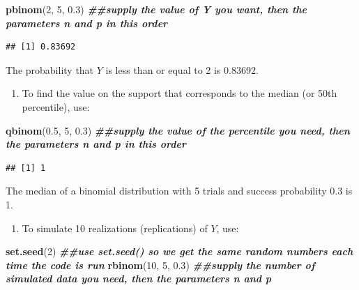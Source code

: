 \documentclass[
]{book}
\newenvironment{Shaded}{\begin{snugshade}}{\end{snugshade}}
\newcommand{\DecValTok}[1]{\textcolor[rgb]{0.00,0.00,0.81}{#1}}
\newcommand{\DocumentationTok}[1]{\textcolor[rgb]{0.56,0.35,0.01}{\textbf{\textit{#1}}}}
\newcommand{\FloatTok}[1]{\textcolor[rgb]{0.00,0.00,0.81}{#1}}
\newcommand{\FunctionTok}[1]{\textcolor[rgb]{0.13,0.29,0.53}{\textbf{#1}}}
\newcommand{\NormalTok}[1]{#1}
\providecommand{\tightlist}{%
  \setlength{\itemsep}{0pt}\setlength{\parskip}{0pt}}
\begin{document}
\begin{Shaded}
\begin{Highlighting}[]
\FunctionTok{pbinom}\NormalTok{(}\DecValTok{2}\NormalTok{, }\DecValTok{5}\NormalTok{, }\FloatTok{0.3}\NormalTok{) }\DocumentationTok{\#\#supply the value of Y you want, then the parameters n and p in this order}
\end{Highlighting}
\end{Shaded}

\begin{verbatim}
## [1] 0.83692
\end{verbatim}

The probability that \(Y\) is less than or equal to 2 is 0.83692.

\begin{enumerate}
\def\labelenumi{\arabic{enumi}.}
\setcounter{enumi}{2}
\tightlist
\item
  To find the value on the support that corresponds to the median (or 50th percentile), use:
\end{enumerate}

\begin{Shaded}
\begin{Highlighting}[]
\FunctionTok{qbinom}\NormalTok{(}\FloatTok{0.5}\NormalTok{, }\DecValTok{5}\NormalTok{, }\FloatTok{0.3}\NormalTok{) }\DocumentationTok{\#\#supply the value of the percentile you need, then the parameters n and p in this order}
\end{Highlighting}
\end{Shaded}

\begin{verbatim}
## [1] 1
\end{verbatim}

The median of a binomial distribution with 5 trials and success probability 0.3 is 1.

\begin{enumerate}
\def\labelenumi{\arabic{enumi}.}
\setcounter{enumi}{3}
\tightlist
\item
  To simulate 10 realizations (replications) of \(Y\), use:
\end{enumerate}

\begin{Shaded}
\begin{Highlighting}[]
\FunctionTok{set.seed}\NormalTok{(}\DecValTok{2}\NormalTok{) }\DocumentationTok{\#\#use set.seed() so we get the same random numbers each time the code is run}
\FunctionTok{rbinom}\NormalTok{(}\DecValTok{10}\NormalTok{, }\DecValTok{5}\NormalTok{, }\FloatTok{0.3}\NormalTok{) }\DocumentationTok{\#\#supply the number of simulated data you need, then the parameters n and p}
\end{Highlighting}
\end{Shaded}
\end{document}
